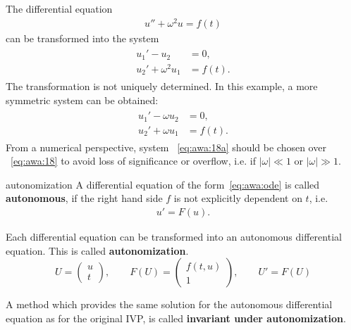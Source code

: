 \begin{example}
  \label{ex:awa:sine-1}
  The differential equation
  \begin{gather}
    \label{eq:awa:17}
    u'' + \omega^2 u = f(t)
  \end{gather}
  can be transformed into the system
  \begin{gather}
    \label{eq:awa:18}
    \begin{split}
      u_1' - u_2 &= 0, \\
      u_2' + \omega^2 u_1 &= f(t).
    \end{split}
  \end{gather}
  The transformation is not uniquely determined. In this example, a
  more symmetric system can be obtained:
  \begin{gather}
    \label{eq:awa:18a}
    \begin{split}
      u_1' - \omega u_2 &= 0, \\
      u_2' + \omega u_1 &= f(t).
    \end{split}
  \end{gather}
  From a numerical perspective, system ~\ref{eq:awa:18a} should be
  chosen over ~\ref{eq:awa:18} to avoid loss of significance or overflow,
  i.e. if $|\omega| \ll 1$ or $|\omega| \gg 1$.
\end{example}

\begin{Definition}{autonomization}
  A differential equation of the form~\eqref{eq:awa:ode} is called
  \textbf{autonomous},  if
  the right hand side $f$ is not explicitly dependent on $t$, i.e.
  \begin{gather}
    u'=F(u).
  \end{gather}

  Each differential equation can be transformed into an autonomous
  differential equation.  This is called
  \textbf{autonomization}. 
  \begin{equation*}
    U = \begin{pmatrix} u \\ t \end{pmatrix},
    \qquad
    F(U) = \begin{pmatrix} f(t,u) \\ 1 \end{pmatrix},
    \qquad
    U' = F(U)
  \end{equation*}

  A method which provides the same solution for the autonomous
  differential equation as for the original IVP, is called
  \textbf{invariant under autonomization}.
\end{Definition}


